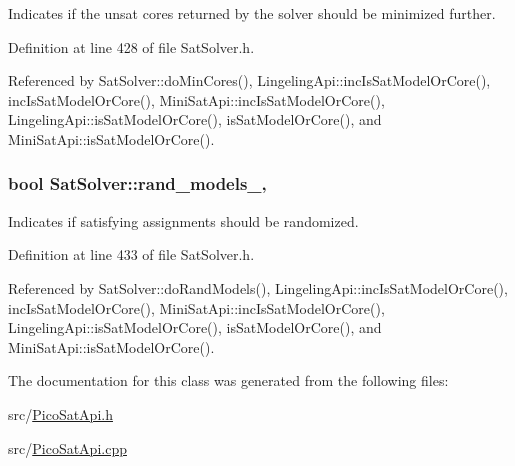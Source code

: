 Indicates if the unsat cores returned by the solver should be minimized further. 



Definition at line 428 of file Sat\-Solver.\-h.



Referenced by Sat\-Solver\-::do\-Min\-Cores(), Lingeling\-Api\-::inc\-Is\-Sat\-Model\-Or\-Core(), inc\-Is\-Sat\-Model\-Or\-Core(), Mini\-Sat\-Api\-::inc\-Is\-Sat\-Model\-Or\-Core(), Lingeling\-Api\-::is\-Sat\-Model\-Or\-Core(), is\-Sat\-Model\-Or\-Core(), and Mini\-Sat\-Api\-::is\-Sat\-Model\-Or\-Core().

\hypertarget{classSatSolver_a73fed24d8fb4da85ef82dc53ac5f28c7}{
\subsubsection[{rand\-\_\-models\-\_\-}]{\setlength{\rightskip}{0pt plus 5cm}bool Sat\-Solver\-::rand\-\_\-models\-\_\-\hspace{0.3cm}{\ttfamily [protected]}, {\ttfamily [inherited]}}}\label{classSatSolver_a73fed24d8fb4da85ef82dc53ac5f28c7}


Indicates if satisfying assignments should be randomized. 



Definition at line 433 of file Sat\-Solver.\-h.



Referenced by Sat\-Solver\-::do\-Rand\-Models(), Lingeling\-Api\-::inc\-Is\-Sat\-Model\-Or\-Core(), inc\-Is\-Sat\-Model\-Or\-Core(), Mini\-Sat\-Api\-::inc\-Is\-Sat\-Model\-Or\-Core(), Lingeling\-Api\-::is\-Sat\-Model\-Or\-Core(), is\-Sat\-Model\-Or\-Core(), and Mini\-Sat\-Api\-::is\-Sat\-Model\-Or\-Core().



The documentation for this class was generated from the following files\-:\begin{DoxyCompactItemize}
\item 
src/\hyperlink{PicoSatApi_8h}{Pico\-Sat\-Api.\-h}\item 
src/\hyperlink{PicoSatApi_8cpp}{Pico\-Sat\-Api.\-cpp}\end{DoxyCompactItemize}
